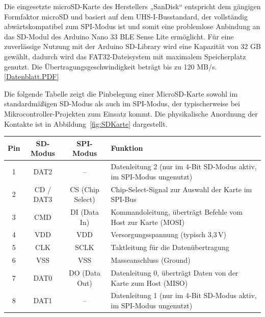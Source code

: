 Die eingesetzte microSD-Karte des Herstellers „SanDisk“ entspricht dem gängigen Formfaktor microSD und basiert auf dem UHS-I-Busstandard, der vollständig abwärtskompatibel zum SPI-Modus ist und somit eine problemlose Anbindung an das SD-Modul des Arduino Nano 33 BLE Sense Lite ermöglicht. Für eine zuverlässige Nutzung mit der Arduino SD-Library wird eine Kapazität von 32 GB gewählt, dadurch wird das FAT32-Dateisystem mit maximalem Speicherplatz genutzt. Die Übertragungsgeschwindigkeit beträgt bis zu 120 MB/s.
\cite{WesternDigitalTechnologies.2022} 
\href{../../../Documents/Datenblaetter/Datenbatt SD-Karte}{[Datenblatt.PDF]}


Die folgende Tabelle zeigt die Pinbelegung einer MicroSD-Karte sowohl im standardmäßigen SD-Modus als auch im SPI-Modus, der typischerweise bei Mikrocontroller-Projekten zum Einsatz kommt. Die physikalische Anordnung der Kontakte ist in Abbildung~\ref{fig:SDKarte} dargestellt. \cite{KingstonTechnology.2022}

\begin{center}
    \begin{tabular}{|c|c|c|p{8cm}|}
        \hline
        \textbf{Pin} & \textbf{SD-Modus} & \textbf{SPI-Modus} & \textbf{Funktion} \\
        \hline
        1 & DAT2         & –                 & Datenleitung 2 (nur im 4-Bit SD-Modus aktiv, im SPI-Modus ungenutzt) \\
        2 & CD / DAT3    & CS (Chip Select)  & Chip-Select-Signal zur Auswahl der Karte im SPI-Bus \\
        3 & CMD          & DI (Data In)      & Kommandoleitung, überträgt Befehle vom Host zur Karte (MOSI) \\
        4 & VDD          & VDD               & Versorgungsspannung (typisch 3{,}3\,V) \\
        5 & CLK          & SCLK              & Taktleitung für die Datenübertragung \\
        6 & VSS          & VSS               & Masseanschluss (Ground) \\
        7 & DAT0         & DO (Data Out)     & Datenleitung 0, überträgt Daten von der Karte zum Host (MISO) \\
        8 & DAT1         & –                 & Datenleitung 1 (nur im 4-Bit SD-Modus aktiv, im SPI-Modus ungenutzt) \\
        \hline
    \end{tabular}
    \label{tab:microSD_Pinbelegung}
\end{center}

